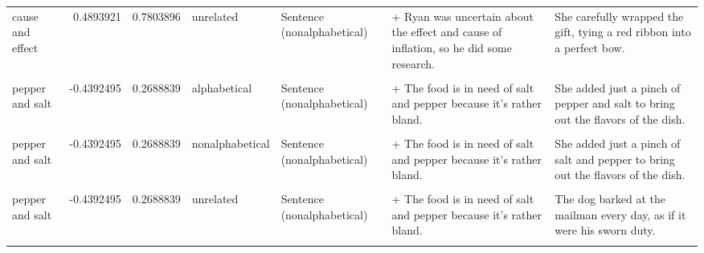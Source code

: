 \documentclass[
  12pt,
]{scrartcl}
\begin{document}
\begin{landscape}
\begin{longtable}{lrrllll}
cause and effect & 0.4893921 & 0.7803896 & unrelated & Sentence (nonalphabetical) & + Ryan was uncertain about the effect and cause of inflation, so he did some research. & She carefully wrapped the gift, tying a red ribbon into a perfect bow.\\
\cellcolor{gray!6}{pepper and salt} & \cellcolor{gray!6}{-0.4392495} & \cellcolor{gray!6}{0.2688839} & \cellcolor{gray!6}{alphabetical} & \cellcolor{gray!6}{Sentence (alphabetical)} & \cellcolor{gray!6}{+ The food is in need of pepper and salt because it's rather bland.} & \cellcolor{gray!6}{She added just a pinch of pepper and salt to bring out the flavors of the dish.}\\
\addlinespace
pepper and salt & -0.4392495 & 0.2688839 & alphabetical & Sentence (nonalphabetical) & + The food is in need of salt and pepper because it's rather bland. & She added just a pinch of pepper and salt to bring out the flavors of the dish.\\
\cellcolor{gray!6}{pepper and salt} & \cellcolor{gray!6}{-0.4392495} & \cellcolor{gray!6}{0.2688839} & \cellcolor{gray!6}{nonalphabetical} & \cellcolor{gray!6}{Sentence (alphabetical)} & \cellcolor{gray!6}{+ The food is in need of pepper and salt because it's rather bland.} & \cellcolor{gray!6}{She added just a pinch of salt and pepper to bring out the flavors of the dish.}\\
pepper and salt & -0.4392495 & 0.2688839 & nonalphabetical & Sentence (nonalphabetical) & + The food is in need of salt and pepper because it's rather bland. & She added just a pinch of salt and pepper to bring out the flavors of the dish.\\
\cellcolor{gray!6}{pepper and salt} & \cellcolor{gray!6}{-0.4392495} & \cellcolor{gray!6}{0.2688839} & \cellcolor{gray!6}{unrelated} & \cellcolor{gray!6}{Sentence (alphabetical)} & \cellcolor{gray!6}{+ The food is in need of pepper and salt because it's rather bland.} & \cellcolor{gray!6}{The dog barked at the mailman every day, as if it were his sworn duty.}\\
pepper and salt & -0.4392495 & 0.2688839 & unrelated & Sentence (nonalphabetical) & + The food is in need of salt and pepper because it's rather bland. & The dog barked at the mailman every day, as if it were his sworn duty.\\
\addlinespace
\cellcolor{gray!6}{female and male} & \cellcolor{gray!6}{-0.4263521} & \cellcolor{gray!6}{0.3493327} & \cellcolor{gray!6}{alphabetical} & \cellcolor{gray!6}{Sentence (alphabetical)} & \cellcolor{gray!6}{+ The dog breeder said the female and male puppies are coming today.} & \cellcolor{gray!6}{The study found no significant differences in learning styles between female and male students.}\\

\end{longtable}
\end{landscape}
\end{document}
